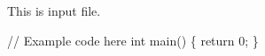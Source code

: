 This is input file.


\begin{DoxyCode}
\textcolor{comment}{// Example code here}
\textcolor{keywordtype}{int} main() \{
    \textcolor{keywordflow}{return} 0;
\}
\end{DoxyCode}
 